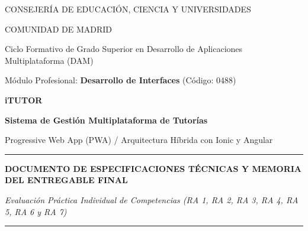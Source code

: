 \documentclass[11pt,a4paper]{article}
\begin{document}
\begin{titlepage}
    \centering
    \vspace*{0.5cm}
    
    {\scshape\Large CONSEJERÍA DE EDUCACIÓN, CIENCIA Y UNIVERSIDADES\par}
    {\scshape\large COMUNIDAD DE MADRID\par}
    \vspace{0.3cm}
    {\large Ciclo Formativo de Grado Superior en Desarrollo de Aplicaciones Multiplataforma (DAM)\par}
    {\large Módulo Profesional: \textbf{Desarrollo de Interfaces} (Código: 0488)\par}
    \vspace{1.5cm}

    \vspace{0.8cm}

    {\huge\bfseries\color{darkNavy} iTUTOR \par}
    \vspace{0.2cm}
    {\Large\bfseries\color{primaryBlue} Sistema de Gestión Multiplataforma de Tutorías\par}
    {\large\color{textMuted} Progressive Web App (PWA) / Arquitectura Híbrida con Ionic y Angular\par}
    
    \vspace{1.2cm}
    \rule{0.8\textwidth}{1.2pt}\par
    \vspace{0.5cm}
    {\large\bfseries DOCUMENTO DE ESPECIFICACIONES TÉCNICAS Y MEMORIA DEL ENTREGABLE FINAL\par}
    {\normalsize\itshape Evaluación Práctica Individual de Competencias (RA 1, RA 2, RA 3, RA 4, RA 5, RA 6 y RA 7)\par}
    \vspace{0.5cm}
    \rule{0.8\textwidth}{1.2pt}\par

    \vfill


\end{titlepage}
\end{document}
